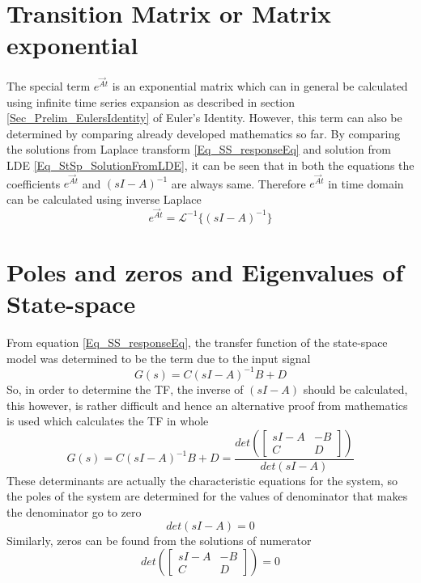 \section{Transition Matrix or Matrix exponential} \label{Sec_StSp_TransitionMatrix}

The special term $e^{\vec{A}t}$ is an exponential matrix which can in general be calculated using infinite time series expansion as described in section \ref{Sec_Prelim_EulersIdentity} of Euler's Identity. However, this term can also be determined by comparing already developed mathematics so far. By comparing the solutions from Laplace transform \eqref{Eq_SS_responseEq} and solution from LDE \eqref{Eq_StSp_SolutionFromLDE}, it can be seen that in both the equations the coefficients $e^{\vec{A}t}$ and $(sI - A)^{-1}$ are always same. Therefore $e^{\vec{A}t}$ in time domain can be calculated using inverse Laplace
\begin{equation}
	e^{\vec{A}t} = \mathcal{L}^{-1}\{(sI - A)^{-1}\}
\end{equation}

\section{Poles and zeros and Eigenvalues of State-space}

From equation \eqref{Eq_SS_responseEq}, the transfer function of the state-space model was determined to be the term due to the input signal
\begin{equation}
	G(s) = C(sI - A)^{-1} B + D
\end{equation}
So, in order to determine the TF, the inverse of $(sI - A)$ should be calculated, this however, is rather difficult and hence an alternative proof from mathematics is used which calculates the TF in whole
\begin{equation}
	G(s) = C(sI - A)^{-1} B + D = \frac{det\left(\begin{bmatrix}
		sI - A & -B \\ C & D
		\end{bmatrix}\right)}{det(sI - A)}
\end{equation}
These determinants are actually the characteristic equations for the system, so the poles of the system are determined for the values of denominator that makes the denominator go to zero
\begin{equation}
	det(sI - A) = 0
\end{equation}
Similarly, zeros can be found from the solutions of numerator
\begin{equation}
	det\left(\begin{bmatrix}
	sI - A & -B \\ C & D
	\end{bmatrix}\right) = 0
\end{equation}

